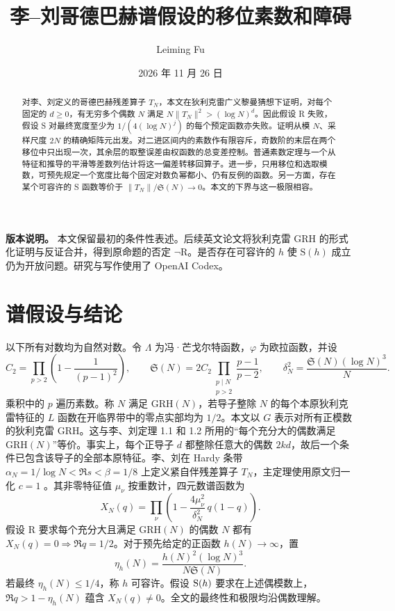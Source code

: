 \documentclass[UTF8,a4paper,11pt,fontset=fandol]{ctexart}
\title{\bfseries 李--刘哥德巴赫谱假设的移位素数和障碍}
\author{Leiming Fu}
\date{2026 年 11 月 26 日}
\newcommand{\Sg}{\mathfrak S}
\newcommand{\Lam}{\Lambda}
\newcommand{\GRH}{\mathrm{GRH}}
\begin{document}
\maketitle
\begin{abstract}
对李、刘定义的哥德巴赫残差算子 \(T_N\)，本文在狄利克雷广义黎曼猜想下证明，对每个固定的 \(d\ge0\)，有无穷多个偶数 \(N\) 满足
\(N\|T_N\|^2>(\log N)^d\)。因此假设 R 失败，假设 S 对最终宽度至少为 \(1/(4(\log N)^j)\) 的每个预定函数亦失败。证明从模 \(N\)、采样尺度 \(2N\) 的精确矩阵元出发。对二进区间内的素数作有限容斥，奇数阶的末层在两个移位中只出现一次，其余层的取整误差由权函数的总变差控制。普通素数定理与一个从特征和推导的平滑等差数列估计将这一偏差转移回算子。进一步，只用移位和选取模数，可预先规定一个宽度比每个固定对数负幂都小、仍有反例的函数。另一方面，存在某个可容许的 S 函数等价于 \(\|T_N\|/\Sg(N)\to0\)。本文的下界与这一极限相容。
\end{abstract}
\noindent\textbf{版本说明。} 本文保留最初的条件性表述。后续英文论文将狄利克雷 GRH 的形式化证明与反证合并，得到原命题的否定 $\neg\mathrm R$。是否存在可容许的 $h$ 使 $\mathrm S(h)$ 成立仍为开放问题。研究与写作使用了 OpenAI Codex。

\section{谱假设与结论}
以下所有对数均为自然对数。令 \(\Lam\) 为冯·芒戈尔特函数，\(\varphi\) 为欧拉函数，并设
\[
 C_2=\prod_{p>2}\left(1-\frac1{(p-1)^2}\right),\qquad
 \Sg(N)=2C_2\prod_{\substack{p\mid N\\p>2}}\frac{p-1}{p-2},
 \qquad \delta_N^2=\frac{\Sg(N)(\log N)^3}{N}.
\]
乘积中的 \(p\) 遍历素数。称 \(N\) 满足 \(\GRH(N)\)，若导子整除 \(N\) 的每个本原狄利克雷特征的 \(L\) 函数在开临界带中的零点实部均为 \(1/2\)。本文以 \(G\) 表示对所有正模数的狄利克雷 GRH。这与李、刘定理 1.1 和 1.2 所用的“每个充分大的偶数满足 \(\GRH(N)\)”等价。事实上，每个正导子 \(d\) 都整除任意大的偶数 \(2kd\)，故后一个条件已包含该导子的全部本原特征。李、刘在 Hardy 条带 \(\alpha_N=1/\log N<\Re s<\beta=1/8\) 上定义紧自伴残差算子 \(T_N\)，主定理使用原文归一化 \(c=1\) \cite{LL}。其非零特征值 \(\mu_\nu\) 按重数计，四元数谱函数为
\[
 X_N(q)=\prod_\nu\left(1-\frac{4\mu_\nu^2}{\delta_N^2}\,q(1-q)\right).
\]
假设 R 要求每个充分大且满足 \(\GRH(N)\) 的偶数 \(N\) 都有 \(X_N(q)=0\Rightarrow\Re q=1/2\)。对于预先给定的正函数 \(h(N)\to\infty\)，置
\[
 \eta_h(N)=\frac{h(N)^2(\log N)^3}{N\Sg(N)} .
\]
若最终 \(\eta_h(N)\le1/4\)，称 \(h\) 可容许。假设 \({\rm S}(h)\) 要求在上述偶模数上，\(\Re q>1-\eta_h(N)\) 蕴含 \(X_N(q)\ne0\)。全文的最终性和极限均沿偶数理解。
\end{document}
